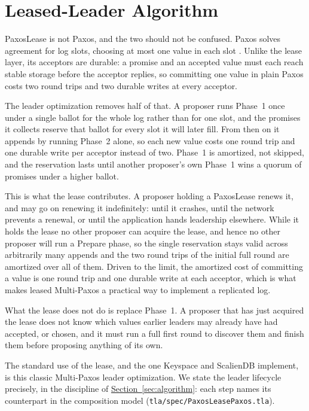 \documentclass[final,5p,times,twocolumn,number]{elsarticle}
\newcommand{\code}[1]{\texttt{#1}}
\newcommand{\secref}[1]{\hyperref[#1]{Section~\ref*{#1}}}
\begin{document}
\section{Leased-Leader Algorithm}\label{sec:paxos}

PaxosLease is not Paxos, and the two should not be confused.  Paxos solves agreement for log slots, choosing at most one value in each slot \cite{ref2}.  Unlike the lease layer, its acceptors are durable: a promise and an accepted value must each reach stable storage before the acceptor replies, so committing one value in plain Paxos costs two round trips and two durable writes at every acceptor.

The leader optimization removes half of that.  A proposer runs Phase~1 once under a single ballot for the whole log rather than for one slot, and the promises it collects reserve that ballot for every slot it will later fill.  From then on it appends by running Phase~2 alone, so each new value costs one round trip and one durable write per acceptor instead of two.  Phase~1 is amortized, not skipped, and the reservation lasts until another proposer's own Phase~1 wins a quorum of promises under a higher ballot.

This is what the lease contributes.  A proposer holding a PaxosLease renews it, and may go on renewing it indefinitely: until it crashes, until the network prevents a renewal, or until the application hands leadership elsewhere.  While it holds the lease no other proposer can acquire the lease, and hence no other proposer will run a Prepare phase, so the single reservation stays valid across arbitrarily many appends and the two round trips of the initial full round are amortized over all of them.  Driven to the limit, the amortized cost of committing a value is one round trip and one durable write at each acceptor, which is what makes leased Multi-Paxos a practical way to implement a replicated log.

What the lease does not do is replace Phase~1.  A proposer that has just acquired the lease does not know which values earlier leaders may already have had accepted, or chosen, and it must run a full first round to discover them and finish them before proposing anything of its own.

The standard use of the lease, and the one Keyspace and ScalienDB implement, is this classic Multi-Paxos leader optimization.  We state the leader lifecycle precisely, in the discipline of \secref{sec:algorithm}: each step names its counterpart in the composition model (\code{tla/spec/PaxosLeasePaxos.tla}).
\end{document}
